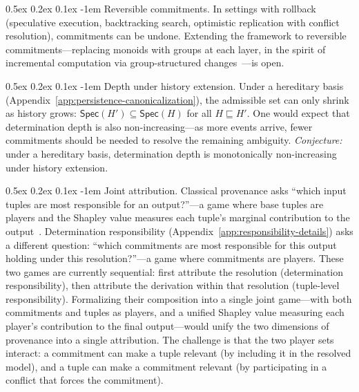 \documentclass[acmsmall,review,anonymous]{acmart}
\makeatletter
\renewcommand{\paragraph}{\@startsection{paragraph}{4}{\z@}%
  {0.5ex \@plus 0.2ex \@minus 0.1ex}%
  {-1em}%
  {\normalfont\normalsize\bfseries}}
\newcommand{\Spec}{\mathsf{Spec}}
\theoremstyle{remark}
\numberwithin{definition}{section}
\numberwithin{theorem}{section}
\numberwithin{lemma}{section}
\numberwithin{corollary}{section}
\numberwithin{remark}{section}
\numberwithin{example}{section}
\numberwithin{observation}{section}
\numberwithin{assumption}{section}
\makeatother
\begin{document}
\paragraph{Reversible commitments.}
In settings with rollback (speculative execution, backtracking search,
optimistic replication with conflict resolution), commitments can be
undone.
Extending the framework to reversible commitments---replacing monoids
with groups at each layer, in the spirit of incremental computation
via group-structured changes~\cite{budiu2023dbsp}---is open.

\paragraph{Depth under history extension.}
Under a hereditary basis
(Appendix~\ref{app:persistence-canonicalization}), the admissible set
can only shrink as history grows:
$\Spec(H') \subseteq \Spec(H)$ for all $H \sqsubseteq H'$.
One would expect that determination depth is also non-increasing---as
more events arrive, fewer commitments should be needed to resolve the
remaining ambiguity.
\emph{Conjecture:} under a hereditary basis, determination depth is
monotonically non-increasing under history extension.

\paragraph{Joint attribution.}
Classical provenance asks ``which input tuples are most responsible for
an output?''---a game where base tuples are players and the Shapley
value measures each tuple's marginal contribution to the
output~\cite{livshits2021shapley}.
Determination responsibility (Appendix~\ref{app:responsibility-details})
asks a different question: ``which commitments are most responsible for
this output holding under this resolution?''---a game where commitments
are players.
These two games are currently sequential: first attribute the
resolution (determination responsibility), then attribute the
derivation within that resolution (tuple-level responsibility).
Formalizing their composition into a single joint game---with both
commitments and tuples as players, and a unified Shapley value
measuring each player's contribution to the final output---would
unify the two dimensions of provenance into a single attribution.
The challenge is that the two player sets interact: a commitment can
make a tuple relevant (by including it in the resolved model), and a
tuple can make a commitment relevant (by participating in a conflict
that forces the commitment).
\end{document}
